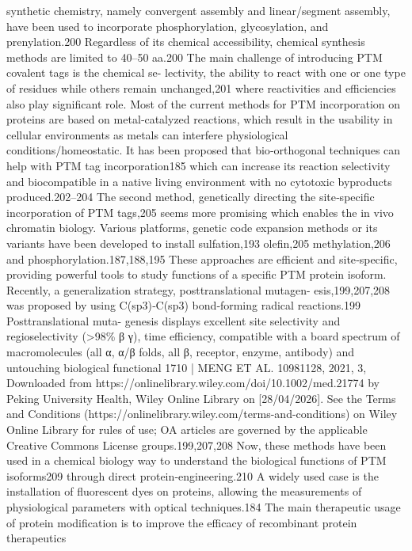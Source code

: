 synthetic chemistry, namely convergent assembly and linear/segment assembly, have been used to incorporate
phosphorylation, glycosylation, and prenylation.200 Regardless of its chemical accessibility, chemical synthesis
methods are limited to 40–50 aa.200 The main challenge of introducing PTM covalent tags is the chemical se-
lectivity, the ability to react with one or one type of residues while others remain unchanged,201 where reactivities
and efficiencies also play significant role. Most of the current methods for PTM incorporation on proteins are
based on metal‐catalyzed reactions, which result in the usability in cellular environments as metals can interfere
physiological conditions/homeostatic. It has been proposed that bio‐orthogonal techniques can help with PTM tag
incorporation185 which can increase its reaction selectivity and biocompatible in a native living environment with
no cytotoxic byproducts produced.202–204 The second method, genetically directing the site‐specific incorporation
of PTM tags,205 seems more promising which enables the in vivo chromatin biology. Various platforms, genetic
code expansion methods or its variants have been developed to install sulfation,193 olefin,205 methylation,206 and
phosphorylation.187,188,195 These approaches are efficient and site‐specific, providing powerful tools to study
functions of a specific PTM protein isoform. Recently, a generalization strategy, posttranslational mutagen-
esis,199,207,208 was proposed by using C(sp3)‐C(sp3) bond‐forming radical reactions.199 Posttranslational muta-
genesis displays excellent site selectivity and regioselectivity (>98\% β γ), time efficiency, compatible with a board
spectrum of macromolecules (all α, α/β folds, all β, receptor, enzyme, antibody) and untouching biological functional
1710 |
MENG ET AL.
 10981128, 2021, 3, Downloaded from https://onlinelibrary.wiley.com/doi/10.1002/med.21774 by Peking University Health, Wiley Online Library on [28/04/2026]. See the Terms and Conditions (https://onlinelibrary.wiley.com/terms-and-conditions) on Wiley Online Library for rules of use; OA articles are governed by the applicable Creative Commons License
groups.199,207,208 Now, these methods have been used in a chemical biology way to understand the biological
functions of PTM isoforms209 through direct protein‐engineering.210 A widely used case is the installation of
fluorescent dyes on proteins, allowing the measurements of physiological parameters with optical techniques.184
The main therapeutic usage of protein modification is to improve the efficacy of recombinant protein therapeutics
